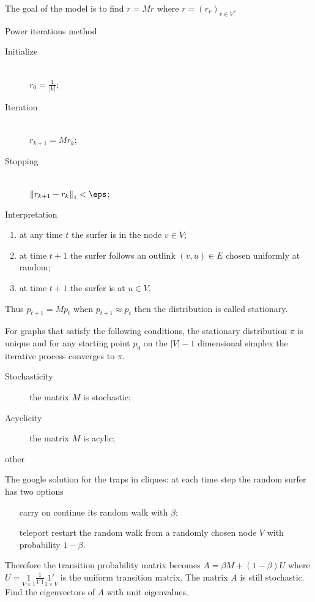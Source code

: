\documentclass[a4paper]{article}
\newcommand{\brac}[1]{{\left ( #1 \right )}}
\newcommand{\abs}[1]{{\left | #1 \right |}}
\newcommand{\nrm}[1]{{\left\| #1 \right \|}}
\begin{document}
The goal of the model is to find $r = Mr$ where $r=\brac{r_v}_{v\in V}$.

Power iterations method \begin{description}
	\item[Initialize] \hfill\\
		$r_0=\frac{1}{\abs{V}}$;
	\item[Iteration] \hfill\\
		$r_{k+1} = M r_k$;
	\item[Stopping] \hfill\\
		$\nrm{r_{k+1}-r_k}_1 < \eps$;
\end{description}

Interpretation
\begin{enumerate}
	\item at any time $t$ the surfer is in the node $v\in V$;
	\item at time $t+1$ the surfer follows an outlink $(v,u)\in E$ chosen uniformly at random;
	\item at time $t+1$ the surfer is at $u\in V$.
\end{enumerate}

Thus $p_{t+1} = M p_t$ when $p_{t+1} \approx p_t$ then the distribution is called stationary.

For graphs that satisfy the following conditions, the stationary distribution $\pi$ is unique and for any starting point $p_0$ on the $\abs{V}-1$ dimensional simplex the iterative process converges to $\pi$.
\begin{description}
	\item[Stochasticity] the matrix $M$ is stochastic;
	\item[Acyclicity] the matrix $M$ is acylic;
	\item[other] 
\end{description}

The google solution for the traps in cliques: at each time step the random surfer has two options
\begin{itemize}
	\item[carry on] continue its random walk with $\beta$;
	\item[teleport] restart the random walk from a randomly chosen node $V$ with probability $1-\beta$.
\end{itemize}

Therefore the transition probability matrix becomes $A = \beta M + (1-\beta)U$ where $U = \underset{V\times 1}{1}\frac{1}{1'1}\underset{1\times V}{1'}$ is the uniform transition matrix.
The matrix $A$ is still stochastic. Find the eigenvectors of $A$ with unit eigenvalues.
\end{document}
